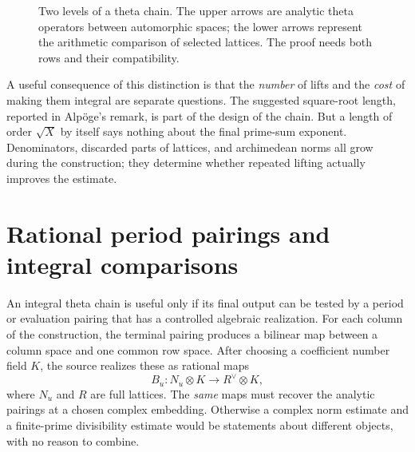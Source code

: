 \documentclass[11pt,openany,oneside]{scrbook}
\theoremstyle{definition}
\theoremstyle{remark}
\begin{document}
\begin{figure}[ht]
\centering
{}
\caption{Two levels of a theta chain. The upper arrows are analytic theta operators between automorphic spaces; the lower arrows represent the arithmetic comparison of selected lattices. The proof needs both rows and their compatibility.}
\label{fig:theta-integral}
\end{figure}

A useful consequence of this distinction is that the \emph{number} of lifts and the \emph{cost} of making them integral are separate questions.  The suggested square-root length, reported in Alp\"oge's remark, is part of the design of the chain.  But a length of order $\sqrt X$ by itself says nothing about the final prime-sum exponent.  Denominators, discarded parts of lattices, and archimedean norms all grow during the construction; they determine whether repeated lifting actually improves the estimate.

\section{Rational period pairings and integral comparisons}\label{sec:theta-period-pairing}

An integral theta chain is useful only if its final output can be tested by a period or evaluation pairing that has a controlled algebraic realization.  For each column of the construction, the terminal pairing produces a bilinear map between a column space and one common row space.  After choosing a coefficient number field $K$, the source realizes these as rational maps
\begin{equation}\label{eq:rational-pairings}
B_u:N_u\otimes K\longrightarrow R^\vee\otimes K,
\end{equation}
where $N_u$ and $R$ are full lattices.  The \emph{same} maps must recover the analytic pairings at a chosen complex embedding.  Otherwise a complex norm estimate and a finite-prime divisibility estimate would be statements about different objects, with no reason to combine.
\end{document}
